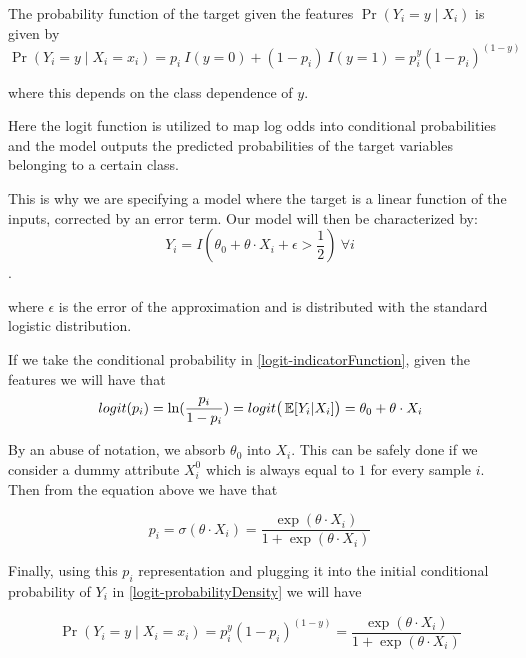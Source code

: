 The probability function of the target given the features $\Pr(Y_i=y\mid X_i)$ is given by
\begin{equation}\label{logit-probabilityDensity}
\Pr(Y_i=y \mid X_i = x_i) = p_i \ I(y=0) + (1-p_i) \ I(y=1) = p_i^{y} {(1-p_i)}^{(1-y)}
\end{equation}

where this depends on the class dependence of $y$.

Here the logit function is utilized to map log odds into conditional probabilities and the model outputs the predicted probabilities of the target variables belonging to a certain class.

This is why we are specifying a model where the target is a linear function of the inputs, corrected by an error term. Our model will then be characterized by:
\begin{equation}\label{logit-indicatorFunction}
Y_i = I(\theta_0 + \theta \cdot X_i + \epsilon > \frac{1}{2}) \ \forall i
\end{equation}.

where $\epsilon$ is the error of the approximation and is distributed with the standard logistic distribution. %

If we take the conditional probability in \cref{logit-indicatorFunction}, given the features we will have that
\begin{equation}
logit(p_i)= \ln(\frac{p_i}{1-p_i}) = logit\big( \operatorname{\mathbb{E}}[Y_i| X_i] \big) = \theta_0 + \theta \cdot X_i
\end{equation}

By an abuse of notation, we absorb $\theta_0$ into $X_i$. This can be safely done if we consider a dummy attribute $X_i^0$ which is always equal to $1$ for every sample $i$. Then from the equation above we have that

\begin{equation}
p_i = \sigma(\theta \cdot X_i) = \frac{\exp(\theta \cdot X_i) }{1 + \exp(\theta \cdot X_i)}
\end{equation}

Finally, using this $p_i$ representation and plugging it into the initial conditional probability of $Y_i$ in \cref{logit-probabilityDensity} we will have

\begin{equation}
 \Pr(Y_i=y \mid X_i = x_i) = p_i^{y} {(1-p_i)}^{(1-y)} = \frac{\exp(\theta \cdot X_i) }{1 + \exp(\theta \cdot X_i)}
 \end{equation}


